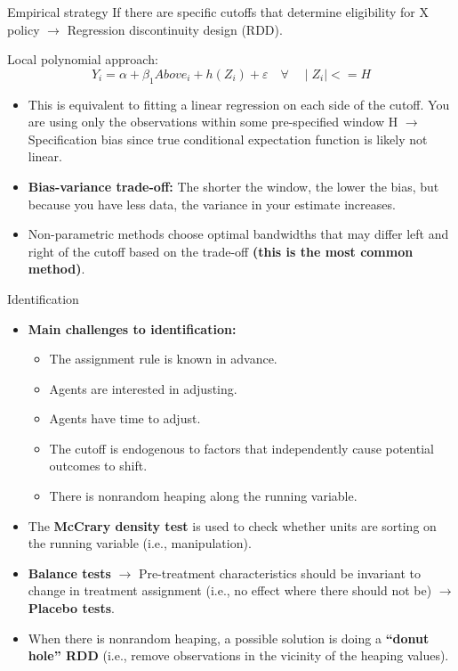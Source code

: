\documentclass[11pt, aspectratio=169]{beamer}
\begin{document}
\begin{frame}{Empirical strategy}
If there are specific cutoffs that determine eligibility for X policy $\longrightarrow$ Regression discontinuity design (RDD).

Local polynomial approach:
    \begin{equation*}
    Y_i = \alpha + \beta_1 Above_i + h(Z_i) + \varepsilon \quad \forall \quad \mid Z_i \mid <= H
\end{equation*}

\begin{itemize}
    \item This is equivalent to fitting a linear regression on each side of the cutoff. You are using only the observations within some pre-specified window H $\longrightarrow$ Specification bias since true conditional expectation function is likely not linear.
    \item \textbf{Bias-variance trade-off:} The shorter the window, the lower the bias, but because you have less data, the variance in your estimate increases.
    \item Non-parametric methods choose optimal bandwidths that may differ left and right of the cutoff based on the trade-off \textbf{(this is the most common method)}.
\end{itemize}

\vfill
\end{frame}

\begin{frame}{Identification}
    \begin{itemize}
        \item<1-> \textbf{Main challenges to identification:}
    \begin{itemize}
        \item<1-> The assignment rule is known in advance.
        \item<1-> Agents are interested in adjusting.
        \item<1-> Agents have time to adjust.
        \item<1-> The cutoff is endogenous to factors that independently cause potential outcomes to shift.
        \item<1-> There is nonrandom heaping along the running variable.
    \end{itemize}

    \item<2-> The \textbf{McCrary density test} is used to check whether units are sorting on the running variable (i.e., manipulation).
    \item<2-> \textbf{Balance tests} $\longrightarrow$ Pre-treatment characteristics should be invariant to change in treatment assignment (i.e., no effect where there should not be) $\longrightarrow$ \textbf{Placebo tests}.
    \item<2-> When there is nonrandom heaping, a possible solution is doing a \textbf{``donut hole'' RDD} (i.e., remove observations in the vicinity of the heaping values).
     \end{itemize}
\end{frame}
\end{document}
